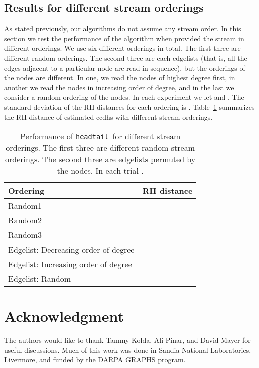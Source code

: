 \documentclass[11pt]{article}
\theoremstyle{definition}
\newcommand{\degdist}{{\tt headtail}}
\begin{document}
\subsection{Results for different stream orderings}
As stated previously, our algorithms do not assume any stream order.  In this
section we test the performance of the algorithm when provided the stream in
different orderings.  We use six different orderings in total.  The first three
are different random orderings.  The second three are each edgelists (that is,
all the edges adjacent to a particular node are read in sequence), but the
orderings of the nodes are different.  In one, we read the nodes of highest
degree first, in another we read the nodes in increasing order of degree, and in
the last we consider a random ordering of the nodes.  In each experiment we let
 and .  The standard deviation of the RH distances for
each ordering is .  Table~\ref{table:ordering} summarizes the RH distance
of estimated ccdhs with different stream orderings.

\begin{table}
\small
\centering
\begin{tabular}{l|l}
\hline
Ordering & RH distance\\
\hline\hline
Random1 & \\\hline
Random2 & \\\hline
Random3 & \\\hline
Edgelist: Decreasing order of degree & \\\hline
Edgelist: Increasing order of degree & \\\hline
Edgelist: Random & \\\hline
\end{tabular}\captionsetup{width=0.9\textwidth}
\caption{Performance of \degdist~for different stream orderings.  The first
three are different random stream orderings.  The second three are edgelists
permuted by the nodes.  In each trial .}
\label{table:ordering}
\end{table}














\section*{Acknowledgment}

The authors would like to thank Tammy Kolda, Ali Pinar, and David Mayer for useful discussions.
Much of this work was done in Sandia National Laboratories, Livermore, and funded by the DARPA
GRAPHS program.













\end{document}
